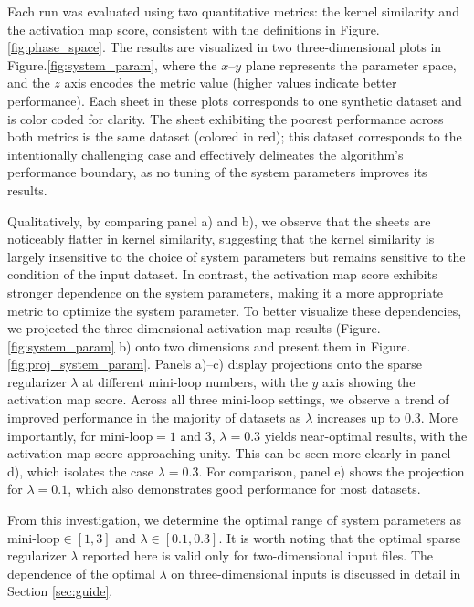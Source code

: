 Each run was evaluated using two quantitative metrics: the kernel similarity and the activation map score, consistent with the definitions in Figure.\ref{fig:phase_space}. The results are visualized in two three-dimensional plots in Figure.\ref{fig:system_param}, where the $x$–$y$ plane represents the parameter space, and the $z$ axis encodes the metric value (higher values indicate better performance). Each sheet in these plots corresponds to one synthetic dataset and is color coded for clarity. The sheet exhibiting the poorest performance across both metrics is the same dataset (colored in red); this dataset corresponds to the intentionally challenging case and effectively delineates the algorithm’s performance boundary, as no tuning of the system parameters improves its results.

Qualitatively, by comparing panel a) and b), we observe that the sheets are noticeably flatter in kernel similarity, suggesting that the kernel similarity is largely insensitive to the choice of system parameters but remains sensitive to the condition of the input dataset. In contrast, the activation map score exhibits stronger dependence on the system parameters, making it a more appropriate metric to optimize the system parameter. To better visualize these dependencies, we projected the three-dimensional activation map results (Figure.\ref{fig:system_param} b) onto two dimensions and present them in Figure.\ref{fig:proj_system_param}. Panels a)–c) display projections onto the sparse regularizer $\lambda$ at different mini-loop numbers, with the $y$ axis showing the activation map score. Across all three mini-loop settings, we observe a trend of improved performance in the majority of datasets as $\lambda$ increases up to 0.3. More importantly, for $\text{mini-loop} = 1$ and $3$, $\lambda = 0.3$ yields near-optimal results, with the activation map score approaching unity. This can be seen more clearly in panel d), which isolates the case $\lambda = 0.3$. For comparison, panel e) shows the projection for $\lambda = 0.1$, which also demonstrates good performance for most datasets.

From this investigation, we determine the optimal range of system parameters as $\text{mini-loop} \in [1, 3]$ and $\lambda \in [0.1, 0.3]$. It is worth noting that the optimal sparse regularizer $\lambda$ reported here is valid only for two-dimensional input files. The dependence of the optimal $\lambda$ on three-dimensional inputs is discussed in detail in Section \ref{sec:guide}.  


